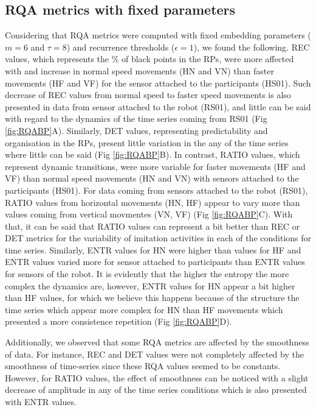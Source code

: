 \documentclass[fleqn,10pt]{wlscirep}
\begin{document}
\subsection*{RQA metrics with fixed parameters}
Considering that RQA metrics were computed with fixed embedding parameters 
($m=6$ and $\tau=8$) and recurrence thresholds ($\epsilon=1$), we found 
the following. REC values, which represents the \% of black points in the RPs, 
were more affected with and increase in normal speed movements (HN and VN) 
than faster movements (HF and VF) for the sensor attached to the participants 
(HS01). Such decrease of REC values from normal speed to faster speed 
movements is also presented in data from sensor attached to the robot (RS01), 
and little can be said with regard to the dynamics of the time series coming 
from RS01 (Fig \ref{fig:RQABP}A).
Similarly, DET values, representing predictability and 
organisation in the RPs, present little variation in the any of the time 
series where little can be said (Fig \ref{fig:RQABP}B).
In contrast, RATIO values, which represent 
dynamic transitions, were more variable for faster movements (HF and VF) 
than normal speed movements (HN and VN) with sensors attached to the 
participants (HS01). For data coming from sensors attached to the robot 
(RS01), RATIO values from horizontal movements (HN, HF) appear to vary 
more than values coming from vertical movmentes (VN, VF) 
(Fig \ref{fig:RQABP}C).
With that, it can be said that RATIO values can represent a bit better
than REC or DET metrics for the variability of imitation activities in 
each of the conditions for time series.
Similarly, ENTR values for HN were higher than values for HF
and ENTR values varied more for sensor attached to participants 
than ENTR values for sensors of the robot. It is evidently that 
the higher the entropy the more complex the dynamics are, 
however, ENTR values for HN appear a bit higher than HF values, 
for which we believe this happens because of the structure the time series
which appear more complex for HN than  HF movements which presented a 
more consistence repetition (Fig \ref{fig:RQABP}D).


Additionally, we observed that some RQA metrics are affected by the 
smoothness of data. 
For instance, REC and DET values were not completely affected by the 
smoothness of time-series since these RQA values seemed to be constants. 
However, for RATIO values, 
the effect of smoothness can be noticed with a slight decrease of amplitude 
in any of the time series conditions which is also presented with ENTR values.
\end{document}
